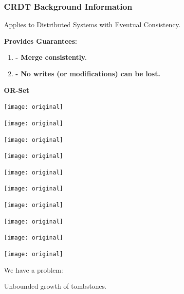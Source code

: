 \documentclass{beamer}
\begin{document}
    \begin{frame}[shrink]
        \frametitle{CRDT Background Information}

        Applies to Distributed Systems with Eventual Consistency.

        \textbf{Provides Guarantees:}

        \begin{enumerate}
            \item \textbf{- Merge consistently.}
            \item \textbf{- No writes (or modifications) can be lost.}
        \end{enumerate}

        \textbf{OR-Set}

    \end{frame}

    \begin{frame}
        \texttt{[image: original]}
    \end{frame}
    \begin{frame}
        \texttt{[image: original]}
    \end{frame}
    \begin{frame}
        \texttt{[image: original]}
    \end{frame}
    \begin{frame}
        \texttt{[image: original]}
    \end{frame}
    \begin{frame}
        \texttt{[image: original]}
    \end{frame}
    \begin{frame}
        \texttt{[image: original]}
    \end{frame}
    \begin{frame}
        \texttt{[image: original]}
    \end{frame}
    \begin{frame}
        \texttt{[image: original]}
    \end{frame}
    \begin{frame}
        \texttt{[image: original]}
    \end{frame}
    \begin{frame}
        \texttt{[image: original]}
    \end{frame}

    \begin{frame}
        \begin{center}
            \large{We have a problem:}
            \pause

            \large{Unbounded growth of tombstones.}
        \end{center}
    \end{frame}
\end{document}
